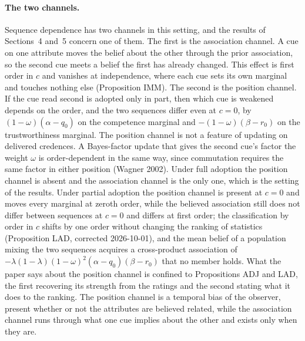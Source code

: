 \documentclass[11pt,a4paper]{article}
\begin{document}
\paragraph{The two channels.}
Sequence dependence has two channels in this setting, and the results of
Sections~4 and~5 concern one of them. The first is the association channel.
A cue on one attribute moves the belief about the other through the
prior association, so the second cue meets a belief the first has already
changed. This effect is first order in $c$ and vanishes at independence,
where each cue sets its own marginal and touches nothing else (Proposition
IMM). The second is the position channel. If the cue read second is adopted
only in part, then which cue is weakened depends on the order, and the two sequences
differ even at $c=0$, by $(1-\omega)(\alpha-q_0)$ on the competence marginal
and $-(1-\omega)(\beta-r_0)$ on the trustworthiness marginal. The position
channel is not a feature of updating on delivered credences. A Bayes-factor
update that gives the second cue's factor the weight $\omega$ is
order-dependent in the same way, since commutation requires the same factor
in either position (Wagner 2002). Under full adoption the position channel
is absent and the association channel is the only one, which is the setting
of the results. Under partial adoption the position channel is present at
$c=0$ and moves every marginal at zeroth order, while the believed
association still does not differ between sequences at $c=0$ and differs at
first order; the classification by order in $c$ shifts by one order without
changing the ranking of statistics (Proposition LAD, corrected 2026-10-01), and
the mean belief of a population mixing the two sequences acquires a
cross-product association of
$-\lambda(1-\lambda)(1-\omega)^2(\alpha-q_0)(\beta-r_0)$ that no member
holds. What the paper says about the position channel is confined to
Propositions ADJ and LAD, the first recovering its strength from the ratings
and the second stating what it does to the ranking. The position
channel is a temporal bias of the observer, present whether or not the
attributes are believed related, while the association channel runs through
what one cue implies about the other and exists only when they are.
\end{document}
